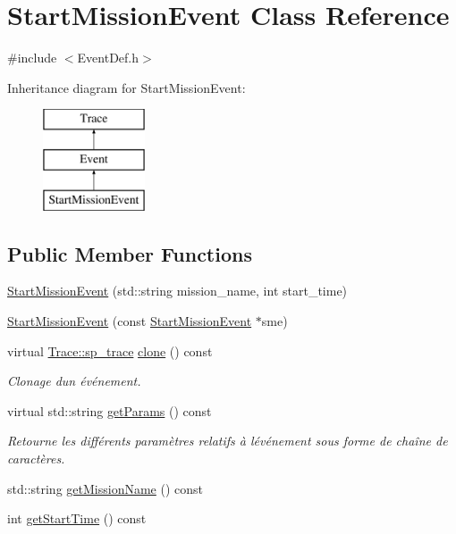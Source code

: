 \hypertarget{class_start_mission_event}{}\section{Start\+Mission\+Event Class Reference}
\label{class_start_mission_event}


{\ttfamily \#include $<$Event\+Def.\+h$>$}

Inheritance diagram for Start\+Mission\+Event\+:\begin{figure}[H]
\begin{center}
\leavevmode
\includegraphics[height=3.000000cm]{class_start_mission_event}
\end{center}
\end{figure}
\subsection*{Public Member Functions}
\begin{DoxyCompactItemize}
\item 
\hyperlink{class_start_mission_event_ad8eb6b28186a393389c733bc1f7d2126}{Start\+Mission\+Event} (std\+::string mission\+\_\+name, int start\+\_\+time)
\item 
\hyperlink{class_start_mission_event_a7eb187e97a54da7f4385724e437db3dc}{Start\+Mission\+Event} (const \hyperlink{class_start_mission_event}{Start\+Mission\+Event} $\ast$sme)
\item 
virtual \hyperlink{class_trace_a9c58e523529fc8a03fb6acf3eef86150}{Trace\+::sp\+\_\+trace} \hyperlink{class_start_mission_event_a4dcda1cb85c391e3594ab1486bc3223d}{clone} () const 
\begin{DoxyCompactList}\small\item\em Clonage d\textquotesingle{}un événement. \end{DoxyCompactList}\item 
virtual std\+::string \hyperlink{class_start_mission_event_a498a3b6e3fa6dfd736486aaa1db421dd}{get\+Params} () const 
\begin{DoxyCompactList}\small\item\em Retourne les différents paramètres relatifs à l\textquotesingle{}événement sous forme de chaîne de caractères. \end{DoxyCompactList}\item 
std\+::string \hyperlink{class_start_mission_event_a605cdb25ede0fbb309816a9175ca250a}{get\+Mission\+Name} () const 
\item 
int \hyperlink{class_start_mission_event_a7fe6b59b37da5c1a25fe5794a4426db6}{get\+Start\+Time} () const 
\end{DoxyCompactItemize}
